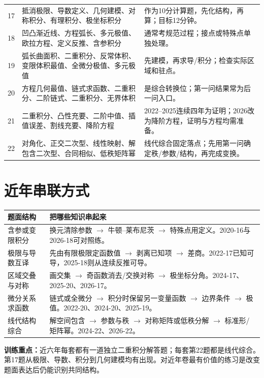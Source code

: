\begin{longtable}{p{9mm}p{57mm}p{80mm}}
17&抵消极限、导数定义、几何建模、对称积分、有理积分、极坐标积分&作为10分计算题，先化结构，再算；目标12分钟。\\
18&凹凸渐近线、方程弧长、多元极值、欧拉方程、定义反推、含参积分&通常考规范过程；接点或特殊点单独处理。\\
19&弧长曲面积、二重积分、反常体积、变限体积最值、全微分极值、多元极值&先建模，再求导/积分；检查实际区域和驻点。\\
20&方程几何最值、链式求函数、二重积分、二阶链式、二重积分、无界体积&是综合转换位；第一问结果常为后一问入口。\\
21&二重积分、凸性充要、二阶中值、插值误差、割线充要、降阶方程&2022--2025连续四年为证明；2026改为降阶方程，证明与方程均需准备。\\
22&对角化、正交二次型、线性映射、解包含二次型、合同相似、低秩矩阵幂&线代综合固定落点；先用第一问确定秩/参数/结构，再完成变换。\\\bottomrule
\end{longtable}\normalsize

\section{近年串联方式}
\begin{tabularx}{\textwidth}{p{31mm}Y}
\toprule 题面结构&把哪些知识串起来\\\midrule
含参或变限积分&换元清除参数 $\to$ 牛顿--莱布尼茨 $\to$ 特殊点用定义。2020-16与2026-18可对照练。\\
极限与导数互译&先由有限极限定函数值 $\to$ 剥离已知项 $\to$ 差商。2022-17已知可导，2025-18则从连续反推可导。\\
区域交叠与对称&画交集 $\to$ 奇函数消去/交换对称 $\to$ 极坐标分角。2024-17、2025-20、2026-17。\\
微分关系求函数&链式或全微分 $\to$ 积分时保留另一变量函数 $\to$ 边界条件 $\to$ 极值。2022-20、2024-20、2025-19。\\
线代结构综合&解空间包含 $\to$ 参数与秩 $\to$ 对称矩阵或低秩分解 $\to$ 标准形/矩阵幂。2024-22、2026-22。\\\bottomrule
\end{tabularx}
\textbf{训练重点：}近六年每套都有一道独立二重积分解答题；每套第22题都是线代综合。第17题从极限、导数、积分到几何建模均有出现。对近年卷最有价值的练习是改变题面表达后仍能识别共同结构。

